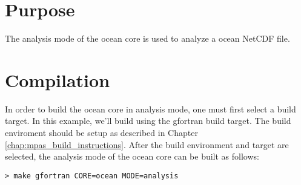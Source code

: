 \section{Purpose}
\label{sec:analysis_purpose}

The analysis mode of the ocean core is used to analyze a ocean NetCDF file.

\section{Compilation}
\label{sec:analysis_compilation}

In order to build the ocean core in analysis mode, one must first select a
build target. In this example, we'll build using the gfortran build target. The
build enviroment should be setup as described in Chapter
\ref{chap:mpas_build_instructions}. After the build environment and target are
selected, the analysis mode of the ocean core can be built as follows:

\vspace{12pt}
{\tt > make gfortran CORE=ocean MODE=analysis}

